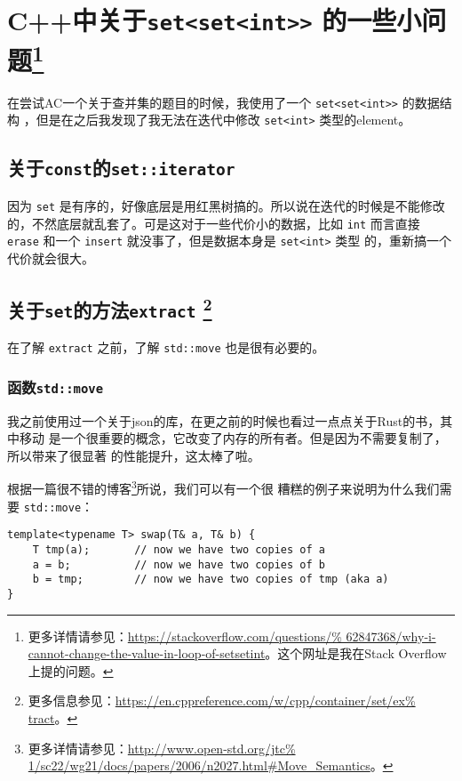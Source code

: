 
\section[C++中关于{\tt set<set<int>>}的一些小问题]{C++中关于{\tt set<set<int>>}%
的一些小问题\footnote{更多详情请参见：\url{https://stackoverflow.com/questions/%
62847368/why-i-cannot-change-the-value-in-loop-of-setsetint}。这个网址是我在Stack
Overflow 上提的问题。}}

在尝试AC一个关于查并集的题目的时候，我使用了一个 \verb|set<set<int>>| 的数据结构
，但是在之后我发现了我无法在迭代中修改 \verb|set<int>| 类型的element。

\subsection{关于{\tt const}的{\tt set::iterator}}

因为 \verb|set| 是有序的，好像底层是用红黑树搞的。所以说在迭代的时候是不能修改
的，不然底层就乱套了。可是这对于一些代价小的数据，比如 \verb|int| 而言直接 
\verb|erase| 和一个 \verb|insert| 就没事了，但是数据本身是 \verb|set<int>| 类型
的，重新搞一个代价就会很大。

\subsection[关于{\tt set}的方法{\tt extract}]{关于{\tt set}的方法{\tt extract}%
\footnote{更多信息参见：\url{https://en.cppreference.com/w/cpp/container/set/ex%
tract}。}}

在了解 \verb|extract| 之前，了解 \verb|std::move| 也是很有必要的。

\subsubsection{函数{\tt std::move}}

我之前使用过一个关于json的库，在更之前的时候也看过一点点关于Rust的书，其中移动
是一个很重要的概念，它改变了内存的所有者。但是因为不需要复制了，所以带来了很显著
的性能提升，这太棒了啦。

根据一篇很不错的博客\footnote{更多详情请参见：\url{http://www.open-std.org/jtc%
1/sc22/wg21/docs/papers/2006/n2027.html\#Move_Semantics}。}所说，我们可以有一个很
糟糕的例子来说明为什么我们需要 \verb|std::move|：
\begin{lstlisting}
template<typename T> swap(T& a, T& b) {
    T tmp(a);       // now we have two copies of a
    a = b;          // now we have two copies of b
    b = tmp;        // now we have two copies of tmp (aka a)
}
\end{lstlisting}

